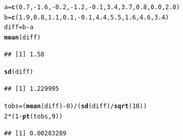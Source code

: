 \documentclass[t,xcolor=pdftex,dvipsnames,table]{beamer}\usepackage[]{graphicx}\usepackage[]{color}
\makeatletter
\newcommand{\hlnum}[1]{\textcolor[rgb]{0.686,0.059,0.569}{#1}}%
\newcommand{\hlopt}[1]{\textcolor[rgb]{0,0,0}{#1}}%
\newcommand{\hlstd}[1]{\textcolor[rgb]{0.345,0.345,0.345}{#1}}%
\newcommand{\hlkwb}[1]{\textcolor[rgb]{0.69,0.353,0.396}{#1}}%
\newcommand{\hlkwd}[1]{\textcolor[rgb]{0.737,0.353,0.396}{\textbf{#1}}}%
\newenvironment{kframe}{%
 \def\at@end@of@kframe{}%
 \ifinner\ifhmode%
  \def\at@end@of@kframe{\end{minipage}}%
  \begin{minipage}{\columnwidth}%
 \fi\fi%
 \def\FrameCommand##1{\hskip\@totalleftmargin \hskip-\fboxsep
 \colorbox{shadecolor}{##1}\hskip-\fboxsep
     \hskip-\linewidth \hskip-\@totalleftmargin \hskip\columnwidth}%
 \MakeFramed {\advance\hsize-\width
   \@totalleftmargin\z@ \linewidth\hsize
   \@setminipage}}%
 {\par\unskip\endMakeFramed%
 \at@end@of@kframe}
\newenvironment{knitrout}{}{} %
\makeatother
\begin{document}
\begin{frame}[fragile]{}
\begin{knitrout}
\color{fgcolor}\begin{kframe}
\begin{alltt}
\hlstd{a}\hlkwb{=}\hlkwd{c}\hlstd{(}\hlnum{0.7}\hlstd{,}\hlopt{-}\hlnum{1.6}\hlstd{,}\hlopt{-}\hlnum{0.2}\hlstd{,}\hlopt{-}\hlnum{1.2}\hlstd{,}\hlopt{-}\hlnum{0.1}\hlstd{,}\hlnum{3.4}\hlstd{,}\hlnum{3.7}\hlstd{,}\hlnum{0.8}\hlstd{,}\hlnum{0.0}\hlstd{,}\hlnum{2.0}\hlstd{)}
\hlstd{b}\hlkwb{=}\hlkwd{c}\hlstd{(}\hlnum{1.9}\hlstd{,}\hlnum{0.8}\hlstd{,}\hlnum{1.1}\hlstd{,}\hlnum{0.1}\hlstd{,}\hlopt{-}\hlnum{0.1}\hlstd{,}\hlnum{4.4}\hlstd{,}\hlnum{5.5}\hlstd{,}\hlnum{1.6}\hlstd{,}\hlnum{4.6}\hlstd{,}\hlnum{3.4}\hlstd{)}
\hlstd{diff}\hlkwb{=}\hlstd{b}\hlopt{-}\hlstd{a}
\hlkwd{mean}\hlstd{(diff)}
\end{alltt}
\begin{verbatim}
## [1] 1.58
\end{verbatim}
\begin{alltt}
\hlkwd{sd}\hlstd{(diff)}
\end{alltt}
\begin{verbatim}
## [1] 1.229995
\end{verbatim}
\begin{alltt}
\hlstd{tobs} \hlkwb{=} \hlstd{(}\hlkwd{mean}\hlstd{(diff)}\hlopt{-}\hlnum{0}\hlstd{)}\hlopt{/}\hlstd{(}\hlkwd{sd}\hlstd{(diff)}\hlopt{/}\hlkwd{sqrt}\hlstd{(}\hlnum{10}\hlstd{))}
\hlnum{2}\hlopt{*}\hlstd{(}\hlnum{1}\hlopt{-}\hlkwd{pt}\hlstd{(tobs,}\hlnum{9}\hlstd{))}
\end{alltt}
\begin{verbatim}
## [1] 0.00283289
\end{verbatim}
\end{kframe}
\end{knitrout}
\end{frame}
\end{document}
